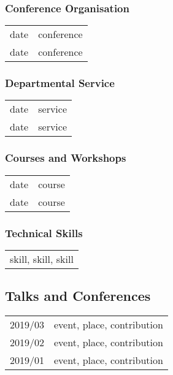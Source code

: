 \subsubsection{Conference Organisation}

\begin{tabular}{rl}
    date & conference \\
    date & conference \\
\end{tabular}

\subsubsection{Departmental Service}

\begin{tabular}{rl}
    date & service \\
    date & service \\
\end{tabular}

\subsubsection{Courses and Workshops}

\begin{tabular}{rl}
    date & course \\
    date & course \\
\end{tabular}

\subsubsection{Technical Skills}

\begin{tabular}{l}
    skill, skill, skill \\
\end{tabular}



\subsection{Talks and Conferences}

\begin{tabular}{r l}
    2019/03 & event, place, contribution \\
    2019/02 & event, place, contribution \\
    2019/01 & event, place, contribution \\
\end{tabular}

